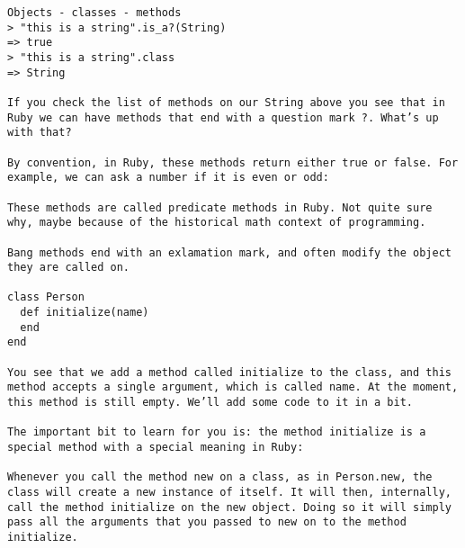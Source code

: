 \documentclass{charun}
\begin{document}
\begin{multicols*}{2}
\begin{verbatim}
Objects - classes - methods
> "this is a string".is_a?(String)
=> true
> "this is a string".class
=> String

If you check the list of methods on our String above you see that in Ruby we can have methods that end with a question mark ?. What’s up with that?

By convention, in Ruby, these methods return either true or false. For example, we can ask a number if it is even or odd:

These methods are called predicate methods in Ruby. Not quite sure why, maybe because of the historical math context of programming.

Bang methods end with an exlamation mark, and often modify the object they are called on. 

class Person
  def initialize(name)
  end
end

You see that we add a method called initialize to the class, and this method accepts a single argument, which is called name. At the moment, this method is still empty. We’ll add some code to it in a bit.

The important bit to learn for you is: the method initialize is a special method with a special meaning in Ruby:

Whenever you call the method new on a class, as in Person.new, the class will create a new instance of itself. It will then, internally, call the method initialize on the new object. Doing so it will simply pass all the arguments that you passed to new on to the method initialize.
\end{verbatim}

\end{multicols*}
\end{document}
